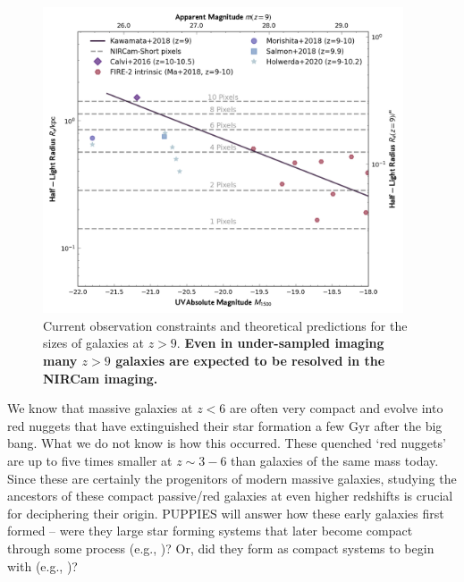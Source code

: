 \documentclass[12pt]{article}
\begin{document}
\begin{figure}
\vspace{-5mm}
  \begin{center}
    \includegraphics[width=0.95\textwidth]{figs/morph.png}
  \end{center}
  \vspace{-5mm}
  \caption{Current observation constraints and theoretical predictions for the sizes of galaxies at $z>9$. \textbf{Even in under-sampled imaging many $z>9$ galaxies are expected to be resolved in the NIRCam imaging.}}
   \label{fig:sizes}
\end{figure}

We know that massive galaxies at $z < 6$ are often very compact and evolve into red nuggets that have extinguished their star formation a few Gyr after the big bang.  What we do not know is how this occurred.  These quenched ‘red nuggets’ are up to five times smaller at $z\sim3-6$ than galaxies of the same mass today.  Since these are certainly the progenitors of modern massive galaxies, studying the ancestors of these compact passive/red galaxies at even higher redshifts is crucial for deciphering their origin.   PUPPIES will answer how these early galaxies first formed -- were they large star forming systems that later become compact through some process (e.g., \citealt{Barro2013,Tacchella2016})? Or, did they form as compact systems to begin with (e.g., \citealt{Lilly2016})?   

\end{document}
